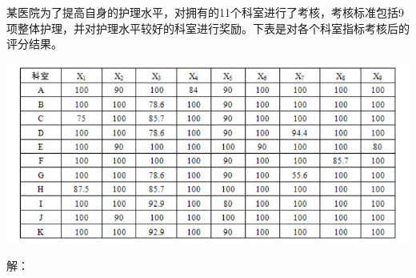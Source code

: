 \documentclass[12pt,a4paper]{article}
\begin{document}
某医院为了提高自身的护理水平，对拥有的11个科室进行了考核，考核标准包括9项整体护理，并对护理水平较好的科室进行奖励。下表是对各个科室指标考核后的评分结果。
\begin{center}
  \includegraphics[width = \textwidth]{figures/entropy_data.png}
\end{center}
解：
\end{document}

